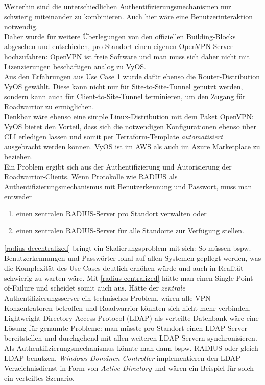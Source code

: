 Weiterhin sind die unterschiedlichen Authentifizierungsmechanismen nur schwierig miteinander zu kombinieren. Auch hier wäre eine Benutzerinteraktion notwendig.\\
Daher wurde für weitere Überlegungen von den offiziellen Building-Blocks abgesehen und entschieden, pro Standort einen eigenen OpenVPN-Server hochzufahren: OpenVPN ist freie Software und man muss sich daher nicht mit Lizenzierungen beschäftigen analog zu VyOS.\\
Aus den Erfahrungen aus Use Case 1 wurde dafür ebenso die Router-Distribution VyOS gewählt. Diese kann nicht nur für \gls{Site-to-Site}-Tunnel genutzt werden, sondern kann auch für \gls{Client-to-Site}-Tunnel terminieren, um den Zugang für \gls{Roadwarrior} zu ermöglichen.\\
Denkbar wäre ebenso eine simple Linux-Distribution mit dem Paket OpenVPN: VyOS bietet den Vorteil, dass sich die notwendigen Konfigurationen ebenso über CLI erledigen lassen und somit per Terraform-Template \textit{automatisiert} ausgebracht werden können\cite{vyosopenvpn2021}. VyOS ist im AWS als auch im Azure Marketplace zu beziehen.\\
Ein Problem ergibt sich aus der Authentifizierung und Autorisierung der \gls{Roadwarrior}-\gls{Client}s. Wenn Protokolle wie RADIUS\cite{rfc2865} als Authentifizierungsmechanismus mit Benutzerkennung und Passwort, muss man entweder
\begin{enumerate}[label=(\alph*)]
\item \label{radius-decentralized} einen zentralen RADIUS-Server pro Standort verwalten oder
\item \label{radius-centralized} einen zentralen RADIUS-Server für alle Standorte zur Verfügung stellen.
\end{enumerate}
\ref{radius-decentralized} bringt ein Skalierungsproblem mit sich: So müssen bspw. Benutzerkennungen und Passwörter lokal auf allen Systemen gepflegt werden, was die Komplexität des Use Cases deutlich erhöhen würde und auch in Realität schwierig zu warten wäre. Mit \ref{radius-centralized} hätte man einen Single-Point-of-Failure und scheidet somit auch aus. Hätte der \textit{zentrale} Authentifizierungsserver ein technisches Problem, wären alle \gls{VPN-Konzentrator}en betroffen und \gls{Roadwarrior} könnten sich nicht mehr verbinden.\\
Lightweight Directory Access Protocol (LDAP)\cite{rfc4511} als verteilte Datenbank wäre eine Lösung für genannte Probleme: man müsste pro Standort einen LDAP-Server bereitstellen und durchgehend mit allen weiteren LDAP-Servern synchronisieren. Als Authentifizierungsmechanismus könnte man dann bspw. RADIUS\cite{rfc2865} oder gleich LDAP benutzen. \textit{Windows Domänen Controller} implementieren den LDAP-Verzeichnisdienst in Form von \textit{Active Directory} und wären ein Beispiel für solch ein verteiltes Szenario.\cite[S.603-604]{Tanenbaum2003}\\
